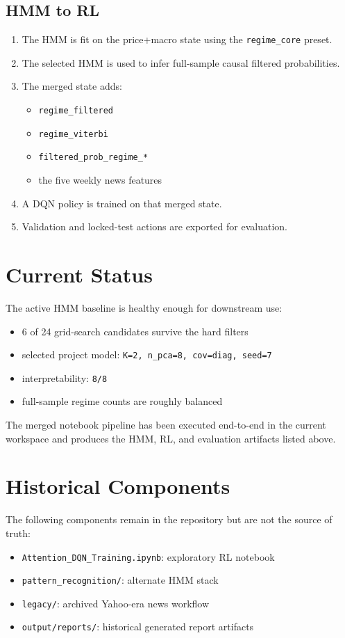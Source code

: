 \documentclass[11pt,a4paper]{article}
\begin{document}
\subsection{HMM to RL}

\begin{enumerate}[nosep]
    \item The HMM is fit on the price+macro state using the \texttt{regime\_core} preset.
    \item The selected HMM is used to infer full-sample causal filtered probabilities.
    \item The merged state adds:
    \begin{itemize}[nosep]
        \item \texttt{regime\_filtered}
        \item \texttt{regime\_viterbi}
        \item \texttt{filtered\_prob\_regime\_*}
        \item the five weekly news features
    \end{itemize}
    \item A DQN policy is trained on that merged state.
    \item Validation and locked-test actions are exported for evaluation.
\end{enumerate}

\section{Current Status}

The active HMM baseline is healthy enough for downstream use:
\begin{itemize}[nosep]
    \item 6 of 24 grid-search candidates survive the hard filters
    \item selected project model: \texttt{K=2, n\_pca=8, cov=diag, seed=7}
    \item interpretability: \texttt{8/8}
    \item full-sample regime counts are roughly balanced
\end{itemize}

The merged notebook pipeline has been executed end-to-end in the current
workspace and produces the HMM, RL, and evaluation artifacts listed above.

\section{Historical Components}

The following components remain in the repository but are not the source of truth:

\begin{itemize}[nosep]
    \item \texttt{Attention\_DQN\_Training.ipynb}: exploratory RL notebook
    \item \texttt{pattern\_recognition/}: alternate HMM stack
    \item \texttt{legacy/}: archived Yahoo-era news workflow
    \item \texttt{output/reports/}: historical generated report artifacts
\end{itemize}
\end{document}

